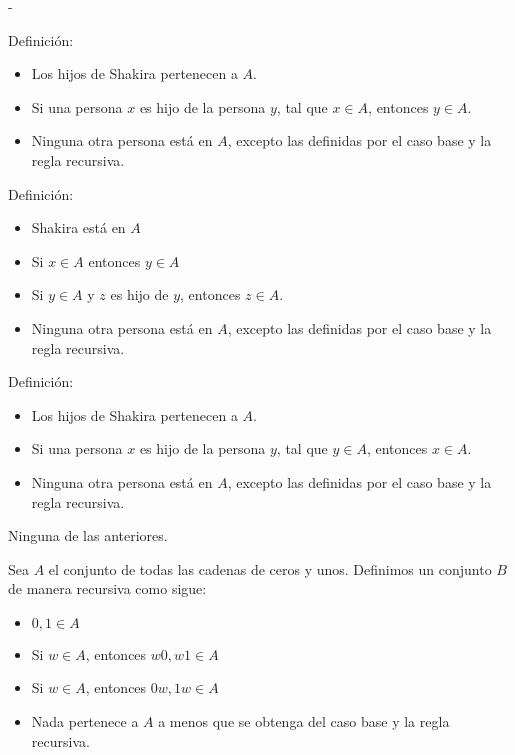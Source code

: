 \documentclass[12pt, a4paper]{exam}
\makeatletter
\renewenvironment{checkboxes}%
   {\setcounter{choice}{0}\list{\checkbox@char}%
      {%
        \settowidth{\leftmargin}{W.\hskip\labelsep\hskip 2.5em}%
        \def\choice{%
          \if@correctchoice
            \color@endgroup \endgroup
          \fi
          \stepcounter{choice}
          \item[\checked@char]
          \do@choice@pageinfo
        } %
        \def\CorrectChoice{%
          \if@correctchoice
            \color@endgroup \endgroup
          \fi
          \ifprintanswers
            \ifhmode \unskip\unskip\unvbox\voidb@x \fi
            \begingroup \color@begingroup \@correctchoicetrue
            \CorrectChoice@Emphasis
            \stepcounter{choice}
            \item[\checked@char]
          \else
            \stepcounter{choice}
            \item[\checked@char]
          \fi
          \do@choice@pageinfo
        } %
        \let\correctchoice\CorrectChoice
        \labelwidth\leftmargin\advance\labelwidth-\labelsep
        \topsep=0pt
        \partopsep=0pt
        \checkboxeshook
      }%
   }%
   {\if@correctchoice \color@endgroup \endgroup \fi \endlist}
\makeatother
\begin{document}
\begin{questions}
\begin{checkboxes}
            \choice Definición:
            \begin{itemize}
                \item Los hijos de Shakira pertenecen a $A$. 
                \item Si una persona $x$ es hijo de la persona $y$, tal que 
                $x \in A$, entonces $y \in A$.
                \item Ninguna otra persona está en $A$, excepto las definidas 
                por el caso base y la regla recursiva. 
            \end{itemize} 

            \choice Definición:
            \begin{itemize}
                \item Shakira está en $A$
                \item Si $x \in A$ entonces $y \in A$
                \item Si $y \in A$ y $z$ es hijo de $y$, entonces $z \in A$.
                \item Ninguna otra persona está en $A$, excepto las definidas 
                por el caso base y la regla recursiva. 
            \end{itemize}

            \choice Definición:
            \begin{itemize}
                \item Los hijos de Shakira pertenecen a $A$. 
                \item Si una persona $x$ es hijo de la persona $y$, tal que 
                $y \in A$, entonces $x \in A$.
                \item Ninguna otra persona está en $A$, excepto las definidas 
                por el caso base y la regla recursiva. 
            \end{itemize} %
            
            \choice Ninguna de las anteriores. 
        \end{checkboxes}

        \newpage
        \question
        {
            Sea $A$ el conjunto de todas las cadenas de ceros y unos. Definimos 
            un conjunto $B$ de manera recursiva como sigue:
            \begin{itemize}
                \item $0,1 \in A$
                \item Si $w \in A$, entonces $w0, w1 \in A$
                \item Si $w \in A$, entonces $0w, 1w \in A$
                \item Nada pertenece a $A$ a menos que se obtenga del caso base
                y la regla recursiva. 
            \end{itemize}

}
\end{questions}
\end{document}
